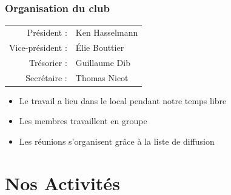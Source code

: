 \documentclass[9pt]{beamer}
\begin{document}
\begin{frame}
	\frametitle{Organisation du club}
	
	
	\begin{tabular}{ r l }
	   Président : & Ken Hasselmann \\
	   Vice-président : & Élie Bouttier  \\
	   Trésorier : & Guillaume Dib  \\
	   Secrétaire : & Thomas Nicot  \\
	\end{tabular}

	\begin{itemize}
		\item Le travail a lieu dans le local pendant notre temps libre
		\item Les membres travaillent en groupe
		\item Les réunions s'organisent grâce à la liste de diffusion
	\end{itemize}

\end{frame}



\section{Nos Activités}
\end{document}
